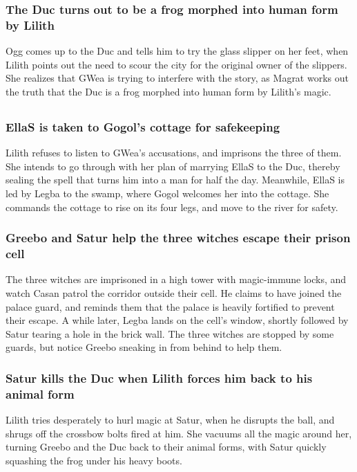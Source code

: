 \subsubsection{The \Gls{Duc} turns out to be a frog morphed into human form by \Gls{Lilith}}
\Gls{Ogg} comes up to the \Gls{Duc} and tells him to try the glass slipper on her feet, when
\Gls{Lilith} points out the need to scour the city for the original owner of the slippers. She
realizes that \Gls{GWea} is trying to interfere with the story, as \Gls{Magrat} works out the truth
that the \Gls{Duc} is a frog morphed into human form by \Gls{Lilith}'s magic.

\subsection{}
\subsubsection{\Gls{EllaS} is taken to \Gls{Gogol}'s cottage for safekeeping}
\Gls{Lilith} refuses to listen to \Gls{GWea}'s accusations, and imprisons the three of them. She
intends to go through with her plan of marrying \Gls{EllaS} to the \Gls{Duc}, thereby sealing the
spell that turns him into a man for half the day. Meanwhile, \Gls{EllaS} is led by \Gls{Legba} to
the swamp, where \Gls{Gogol} welcomes her into the cottage. She commands the cottage to rise on
its four legs, and move to the river for safety.

\subsubsection{\Gls{Greebo} and \Gls{Satur} help the three witches escape their prison cell}
The three witches are imprisoned in a high tower with magic-immune locks, and watch \Gls{Casan}
patrol the corridor outside their cell. He claims to have joined the palace guard, and reminds them
that the palace is heavily fortified to prevent their escape. A while later, \Gls{Legba} lands on
the cell's window, shortly followed by \Gls{Satur} tearing a hole in the brick wall. The three
witches are stopped by some guards, but notice \Gls{Greebo} sneaking in from behind to help them.

\subsubsection{\Gls{Satur} kills the \Gls{Duc} when \Gls{Lilith} forces him back to his animal form}
\Gls{Lilith} tries desperately to hurl magic at \Gls{Satur}, when he disrupts the ball, and shrugs
off the crossbow bolts fired at him. She vacuums all the magic around her, turning \Gls{Greebo} and
the \Gls{Duc} back to their animal forms, with \Gls{Satur} quickly squashing the frog under his
heavy boots.

